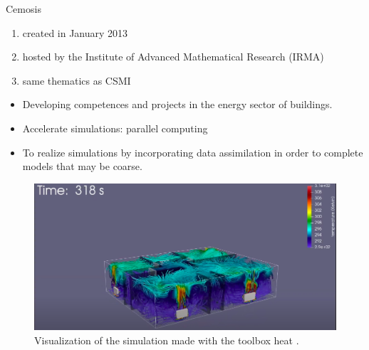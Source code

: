 \documentclass[10pt,xcolor={table,dvipsnames},t]{beamer}
\begin{document}
	\begin{frame}{Cemosis}
		
		\begin{minipage}{0.3\hsize}
			\centering
			\begin{enumerate}[$\rightarrow$]
				\item created in January 2013
				\item hosted by the Institute of Advanced Mathematical Research (IRMA)
				\item same thematics as CSMI
			\end{enumerate}
		\end{minipage} \quad
		\begin{minipage}{0.6\hsize}
			
     \begin{itemize}
        \item Developing
competences and projects in the energy sector of buildings.
\item Accelerate simulations: parallel computing
\item To realize simulations by incorporating data assimilation in order to complete models that may be coarse.
    \end{itemize}
    \begin{figure}
        \centering
        \includegraphics[width=0.65\linewidth]{"images/intro/cemosis_simulation_2.png"}
        \caption{Visualization of the simulation made with the toolbox heat  .}
    \end{figure}
		\end{minipage}
		
	
	\end{frame}
 
\end{document}
